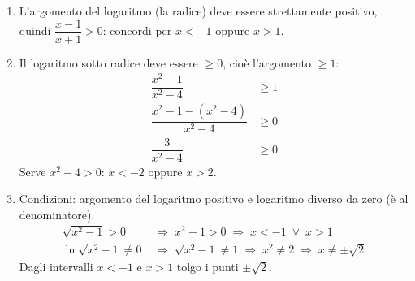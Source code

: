 \begin{question}[ID=1.5, subtitle={Dominio di funzioni complesse}, difficulty=difficile, tags={funzioni, dominio}]
\begin{explanation}
\begin{enumerate}
    \[ \begin{cases} x-2>0 & \text{esistenza del logaritmo}\\ \ln(x-2)\neq 0 & \text{denominatore}\\ \dfrac{x-1}{\ln(x-2)}\geq 0 & \text{radicando}\end{cases} \]
    Per $x>2$ il numeratore $x-1$ è positivo, quindi la frazione è positiva solo se lo è il denominatore:
    \[ \ln(x-2)>0 \;\Rightarrow\; x-2>1 \;\Rightarrow\; x>3 \]
    \item L'argomento del logaritmo (la radice) deve essere strettamente positivo, quindi $\dfrac{x-1}{x+1}>0$: concordi per $x<-1$ oppure $x>1$.
    \item Il logaritmo sotto radice deve essere $\geq0$, cioè l'argomento $\geq1$:
    \[\begin{aligned}
    \dfrac{x^2-1}{x^2-4} &\geq 1\\
    \dfrac{x^2-1-(x^2-4)}{x^2-4} &\geq 0\\
    \dfrac{3}{x^2-4} &\geq 0
    \end{aligned}\]
    Serve $x^2-4>0$: $x<-2$ oppure $x>2$.
    \item Condizioni: argomento del logaritmo positivo e logaritmo diverso da zero (è al denominatore).
    \[\begin{aligned}
    \sqrt{x^2-1}>0 &\;\Rightarrow\; x^2-1>0 \;\Rightarrow\; x<-1 \;\vee\; x>1\\
    \ln\sqrt{x^2-1}\neq 0 &\;\Rightarrow\; \sqrt{x^2-1}\neq 1 \;\Rightarrow\; x^2\neq 2 \;\Rightarrow\; x\neq\pm\sqrt2
    \end{aligned}\]
    Dagli intervalli $x<-1$ e $x>1$ tolgo i punti $\pm\sqrt2$.
\end{enumerate}
\end{explanation}
\end{question}